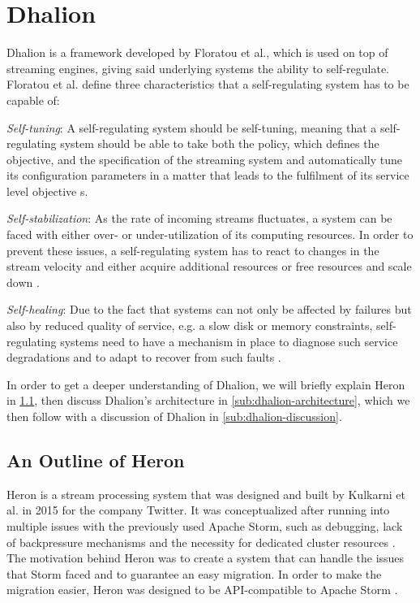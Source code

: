     \section{Dhalion}
    \label{sec:dhalion}
    Dhalion is a framework developed by Floratou et al., which is used on top of streaming engines, giving said underlying systems the ability to self-regulate.  
    Floratou et al. define three characteristics that a self-regulating system has to be capable of:
    
    \quad \textit{Self-tuning}: A self-regulating system should be self-tuning, meaning that a self-regulating system should 
    be able to take both the policy, which defines the objective, and the specification of the streaming system and automatically tune 
    its configuration parameters in a matter that leads to the fulfilment of its service level objective \cite{dhalion}s.
    
    \quad \textit{Self-stabilization}: As the rate of incoming streams fluctuates, a system can be faced with either over- or under-utilization of its computing resources. 
    In order to prevent these issues, a self-regulating system has to react to changes in the stream velocity and either acquire additional resources 
    or free resources and scale down \cite{dhalion}.

    \quad \textit{Self-healing}: Due to the fact that systems can not only be affected by failures but also by reduced quality of service, 
    e.g. a slow disk or memory constraints, self-regulating systems need to have a mechanism in place to diagnose such service degradations and to adapt 
    to recover from such faults \cite{dhalion}.

    In order to get a deeper understanding of Dhalion, we will briefly explain Heron in \ref{sub:heron-outline}, then discuss Dhalion's architecture in \ref{sub:dhalion-architecture}, 
    which we then follow with a discussion of Dhalion in \ref{sub:dhalion-discussion}.

        \subsection{An Outline of Heron}
        \label{sub:heron-outline}
        Heron is a stream processing system that was designed and built by Kulkarni et al. in 2015 for the company Twitter.
        It was conceptualized after running into multiple issues with the previously used Apache Storm, such as debugging, lack of backpressure mechanisms \cite[p. 241]{heron} and the necessity for dedicated cluster resources \cite[p. 239]{heron}. 
        The motivation behind Heron was to create a system that can handle the issues that Storm faced and to guarantee an easy migration. 
        In order to make the migration easier, Heron was designed to be API-compatible to Apache Storm \cite[p. 239]{heron}.
        
